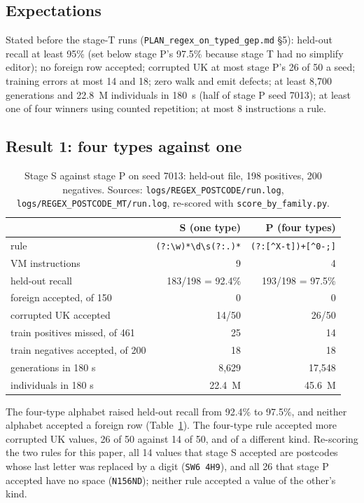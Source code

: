\documentclass[sigconf,nonacm]{acmart}
\newcommand{\rx}{\lstinline[style=mono]}
\newcommand{\src}[1]{{\small\nolinkurl{#1}}}
\begin{document}
\subsection{Expectations}

Stated before the stage-T runs (\src{PLAN_regex_on_typed_gep.md} \S5): held-out
recall at least 95\% (set below stage P's 97.5\% because stage T had no simplify
editor); no foreign row accepted; corrupted UK at most stage P's 26 of 50 a seed;
training errors at most 14 and 18; zero walk and emit defects; at least 8{,}700
generations and 22.8~M individuals in 180~s (half of stage P seed 7013); at least
one of four winners using counted repetition; at most 8 instructions a rule.

\subsection{Result 1: four types against one}

\begin{table}[t]
\caption{Stage S against stage P on seed 7013: held-out file, 198 positives, 200
negatives. Sources: \src{logs/REGEX_POSTCODE/run.log},
\src{logs/REGEX_POSTCODE_MT/run.log}, re-scored with
\src{score_by_family.py}.}
\label{tab:r1}
\footnotesize
\setlength{\tabcolsep}{3pt}
\begin{tabular}{@{}lrr@{}}
\toprule
 & S (one type) & P (four types) \\
\midrule
rule & \rx!(?:\w)*\d\s(?:.)*! & \rx!(?:[^X-t])+[^0-;]! \\
VM instructions & 9 & 4 \\
held-out recall & 183/198 = 92.4\% & 193/198 = 97.5\% \\
foreign accepted, of 150 & 0 & 0 \\
corrupted UK accepted & 14/50 & 26/50 \\
train positives missed, of 461 & 25 & 14 \\
train negatives accepted, of 200 & 18 & 18 \\
generations in 180 s & 8{,}629 & 17{,}548 \\
individuals in 180 s & 22.4~M & 45.6~M \\
\bottomrule
\end{tabular}
\end{table}

The four-type alphabet raised held-out recall from 92.4\% to 97.5\%, and neither
alphabet accepted a foreign row (Table~\ref{tab:r1}). The four-type rule accepted
more corrupted UK values, 26 of 50 against 14 of 50, and of a different kind.
Re-scoring the two rules for this paper, all 14 values that stage S accepted are
postcodes whose last letter was replaced by a digit (\texttt{SW6 4H9}), and all 26
that stage P accepted have no space (\texttt{N156ND}); neither rule accepted a
value of the other's kind.
\end{document}
